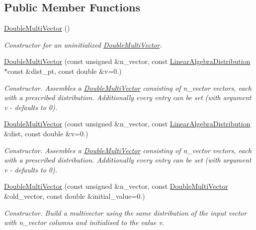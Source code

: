 \subsection*{Public Member Functions}
\begin{DoxyCompactItemize}
\item 
\hyperlink{classoomph_1_1DoubleMultiVector_a3949a54e110bb672981bf4b9d353f2d2}{Double\+Multi\+Vector} ()
\begin{DoxyCompactList}\small\item\em Constructor for an uninitialized \hyperlink{classoomph_1_1DoubleMultiVector}{Double\+Multi\+Vector}. \end{DoxyCompactList}\item 
\hyperlink{classoomph_1_1DoubleMultiVector_a1a24f514e2589235589de6edadf5c058}{Double\+Multi\+Vector} (const unsigned \&n\+\_\+vector, const \hyperlink{classoomph_1_1LinearAlgebraDistribution}{Linear\+Algebra\+Distribution} $\ast$const \&dist\+\_\+pt, const double \&v=0.)
\begin{DoxyCompactList}\small\item\em Constructor. Assembles a \hyperlink{classoomph_1_1DoubleMultiVector}{Double\+Multi\+Vector} consisting of n\+\_\+vector vectors, each with a prescribed distribution. Additionally every entry can be set (with argument v -\/ defaults to 0). \end{DoxyCompactList}\item 
\hyperlink{classoomph_1_1DoubleMultiVector_a05fb9669ba09de5a9c375a5f27859200}{Double\+Multi\+Vector} (const unsigned \&n\+\_\+vector, const \hyperlink{classoomph_1_1LinearAlgebraDistribution}{Linear\+Algebra\+Distribution} \&dist, const double \&v=0.)
\begin{DoxyCompactList}\small\item\em Constructor. Assembles a \hyperlink{classoomph_1_1DoubleMultiVector}{Double\+Multi\+Vector} consisting of n\+\_\+vector vectors, each with a prescribed distribution. Additionally every entry can be set (with argument v -\/ defaults to 0). \end{DoxyCompactList}\item 
\hyperlink{classoomph_1_1DoubleMultiVector_a31b889c87de57fa9a9e994e8e138b8c4}{Double\+Multi\+Vector} (const unsigned \&n\+\_\+vector, const \hyperlink{classoomph_1_1DoubleMultiVector}{Double\+Multi\+Vector} \&old\+\_\+vector, const double \&initial\+\_\+value=0.)
\begin{DoxyCompactList}\small\item\em Constructor. Build a multivector using the same distribution of the input vector with n\+\_\+vector columns and initialised to the value v. \end{DoxyCompactList}\item 

\end{DoxyCompactItemize}
